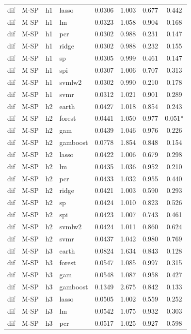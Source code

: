 \begin{ThreePartTable}
\begin{longtable}[t]{llclcccc}
dif & M-SP & h1 & lasso & 0.0306 & 1.003 & 0.677 & 0.442\\
dif & M-SP & h1 & lm & 0.0323 & 1.058 & 0.904 & 0.168\\
dif & M-SP & h1 & pcr & 0.0302 & 0.988 & 0.231 & 0.147\\
dif & M-SP & h1 & ridge & 0.0302 & 0.988 & 0.232 & 0.155\\
dif & M-SP & h1 & sp & 0.0305 & 0.999 & 0.461 & 0.147\\
dif & M-SP & h1 & spi & 0.0307 & 1.006 & 0.707 & 0.313\\
dif & M-SP & h1 & svmlw2 & 0.0302 & 0.990 & 0.210 & 0.178\\
dif & M-SP & h1 & svmr & 0.0312 & 1.021 & 0.901 & 0.289\\
\addlinespace
dif & M-SP & h2 & earth & 0.0427 & 1.018 & 0.854 & 0.243\\
dif & M-SP & h2 & forest & 0.0441 & 1.050 & 0.977 & 0.051*\\
dif & M-SP & h2 & gam & 0.0439 & 1.046 & 0.976 & 0.226\\
dif & M-SP & h2 & gamboost & 0.0778 & 1.854 & 0.848 & 0.154\\
dif & M-SP & h2 & lasso & 0.0422 & 1.006 & 0.679 & 0.298\\
dif & M-SP & h2 & lm & 0.0435 & 1.036 & 0.952 & 0.210\\
dif & M-SP & h2 & pcr & 0.0433 & 1.032 & 0.955 & 0.440\\
dif & M-SP & h2 & ridge & 0.0421 & 1.003 & 0.590 & 0.293\\
dif & M-SP & h2 & sp & 0.0424 & 1.010 & 0.823 & 0.526\\
dif & M-SP & h2 & spi & 0.0423 & 1.007 & 0.743 & 0.461\\
dif & M-SP & h2 & svmlw2 & 0.0424 & 1.011 & 0.860 & 0.624\\
dif & M-SP & h2 & svmr & 0.0437 & 1.042 & 0.980 & 0.769\\
\addlinespace
dif & M-SP & h3 & earth & 0.0824 & 1.634 & 0.843 & 0.128\\
dif & M-SP & h3 & forest & 0.0547 & 1.085 & 0.997 & 0.315\\
dif & M-SP & h3 & gam & 0.0548 & 1.087 & 0.958 & 0.427\\
dif & M-SP & h3 & gamboost & 0.1349 & 2.675 & 0.842 & 0.133\\
dif & M-SP & h3 & lasso & 0.0505 & 1.002 & 0.559 & 0.252\\
dif & M-SP & h3 & lm & 0.0542 & 1.075 & 0.932 & 0.303\\
dif & M-SP & h3 & pcr & 0.0517 & 1.025 & 0.927 & 0.598\\

\end{longtable}
\end{ThreePartTable}
